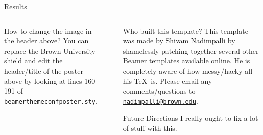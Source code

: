 \documentclass[final]{beamer}
\newlength{\sepwid}
\newlength{\threecolwid}
\newlength{\onehalf}
\begin{document}
\begin{frame}[t]
\begin{columns}[t]
\begin{column}{\threecolwid}
\begin{columns}[t,totalwidth=2\onehalf]
\begin{column}{\onehalf}
\begin{block}{Results}

\lipsum[66]

\lipsum[5]
	
\end{block}







	
	    
\end{column}
 
\end{columns}

\vspace{1cm}


\begin{columns}[t,totalwidth=2\onehalf]	%

\begin{column}{\onehalf}

\begin{block}{How to change the image in the header above?}
You can replace the Brown University shield and edit the header/title of the poster above by looking at lines 160-191 of \texttt{beamerthemeconfposter.sty}. 

	
\end{block}






\end{column}

\begin{column}{\sepwid} \vrule \end{column}	

\begin{column}{\onehalf}


\begin{block}{Who built this template?}
This template was made by Shivam Nadimpalli by shamelessly patching together several other Beamer templates available online. He is completely aware of how messy/hacky all his \TeX\ is. Please email any comments/questions to \href{mailto:nadimpalli@brown.edu}{\texttt{nadimpalli@brown.edu}}.
\end{block}

\begin{alertblock}{Future Directions}
I really ought to fix a lot of stuff with this. 
\end{alertblock}



\end{column}
\end{columns}
\end{column}
\end{columns}
\end{frame}
\end{document}
